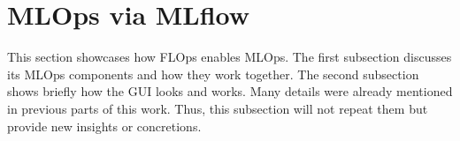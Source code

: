 \section{MLOps via MLflow}

This section showcases how FLOps enables MLOps.
The first subsection discusses its MLOps components and how they work together.
The second subsection shows briefly how the GUI looks and works.
Many details were already mentioned in previous parts of this work.
Thus, this subsection will not repeat them but provide new insights or concretions.



